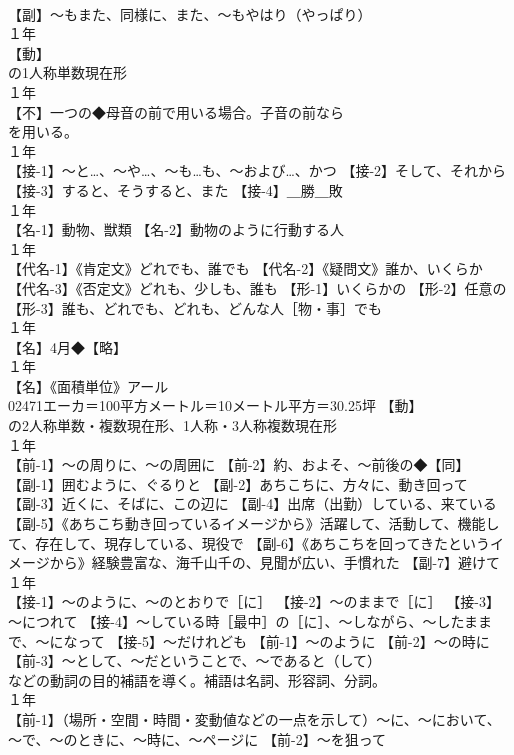 \documentclass[8pt]{extreport}
\begin{document}
\begin{CJK}{UTF8}{min}
\\	【副】～もまた、同様に、また、～もやはり（やっぱり）
\\	１年	
\\	【動】
\\	の1人称単数現在形
\\	１年	
\\	【不】一つの◆母音の前で用いる場合。子音の前なら 
\\	を用いる。
\\	１年	
\\	【接-1】～と…、～や…、～も…も、～および…、かつ 【接-2】そして、それから 【接-3】すると、そうすると、また 【接-4】＿勝＿敗
\\	１年	
\\	【名-1】動物、獣類 【名-2】動物のように行動する人
\\	１年	
\\	【代名-1】《肯定文》どれでも、誰でも 【代名-2】《疑問文》誰か、いくらか 【代名-3】《否定文》どれも、少しも、誰も 【形-1】いくらかの 【形-2】任意の 【形-3】誰も、どれでも、どれも、どんな人［物・事］でも
\\	１年	
\\	【名】4月◆【略】
\\	１年	
\\	【名】《面積単位》アール
\\	02471エーカ＝100平方メートル＝10メートル平方＝30.25坪 【動】
\\	の2人称単数・複数現在形、1人称・3人称複数現在形
\\	１年	
\\	【前-1】～の周りに、～の周囲に 【前-2】約、およそ、～前後の◆【同】
\\	【副-1】囲むように、ぐるりと 【副-2】あちこちに、方々に、動き回って 【副-3】近くに、そばに、この辺に 【副-4】出席（出勤）している、来ている 【副-5】《あちこち動き回っているイメージから》活躍して、活動して、機能して、存在して、現存している、現役で 【副-6】《あちこちを回ってきたというイメージから》経験豊富な、海千山千の、見聞が広い、手慣れた 【副-7】避けて
\\	１年	
\\	【接-1】～のように、～のとおりで［に］ 【接-2】～のままで［に］ 【接-3】～につれて 【接-4】～している時［最中］の［に］、～しながら、～したままで、～になって 【接-5】～だけれども 【前-1】～のように 【前-2】～の時に 【前-3】～として、～だということで、～であると（して）
\\	などの動詞の目的補語を導く。補語は名詞、形容詞、分詞。
\\	１年	
\\	【前-1】（場所・空間・時間・変動値などの一点を示して）～に、～において、～で、～のときに、～時に、～ページに 【前-2】～を狙って

\end{CJK}
\end{document}
